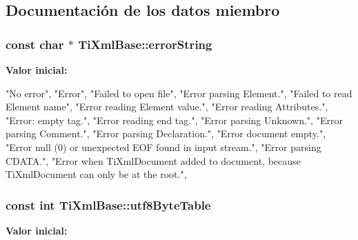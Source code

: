 \subsection{\-Documentación de los datos miembro}
\hypertarget{classTiXmlBase_a7ac8feec4100e446b3d78e1ac0659700}{
\subsubsection[{error\-String}]{\setlength{\rightskip}{0pt plus 5cm}const char $\ast$ \-Ti\-Xml\-Base\-::error\-String}}\label{classTiXmlBase_a7ac8feec4100e446b3d78e1ac0659700}
{\bfseries \-Valor inicial\-:}
\begin{DoxyCode}

{
        "No error",
        "Error",
        "Failed to open file",
        "Error parsing Element.",
        "Failed to read Element name",
        "Error reading Element value.",
        "Error reading Attributes.",
        "Error: empty tag.",
        "Error reading end tag.",
        "Error parsing Unknown.",
        "Error parsing Comment.",
        "Error parsing Declaration.",
        "Error document empty.",
        "Error null (0) or unexpected EOF found in input stream.",
        "Error parsing CDATA.",
        "Error when TiXmlDocument added to document, because TiXmlDocument can
       only be at the root.",
}
\end{DoxyCode}
\hypertarget{classTiXmlBase_ac8c86058137bdb4b413c3eca58f2d467}{
\subsubsection[{utf8\-Byte\-Table}]{\setlength{\rightskip}{0pt plus 5cm}const int \-Ti\-Xml\-Base\-::utf8\-Byte\-Table}}\label{classTiXmlBase_ac8c86058137bdb4b413c3eca58f2d467}
{\bfseries \-Valor inicial\-:}
